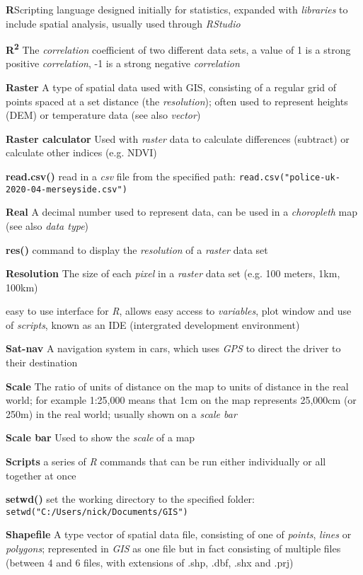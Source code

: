 \documentclass[a4paper,10pt]{article}
\begin{document}
\begin{multicols}{2}
\textbf{R}Scripting language designed initially for statistics, expanded with \textit{libraries} to include spatial analysis, usually used through  \textit{RStudio}

\textbf{R\textsuperscript{2}} The \textit{correlation} coefficient of two different data sets, a value of 1 is a strong positive \textit{correlation}, -1 is a strong negative \textit{correlation}

\textbf{Raster} A type of spatial data used with GIS, consisting of a regular grid of points spaced at a set distance (the \textit{resolution}); often used to represent heights (DEM) or temperature data (see also \textit{vector})

\textbf{Raster calculator} Used with \textit{raster} data to calculate differences (subtract) or calculate other indices (e.g. NDVI)

\textbf{read.csv()} read in a \textit{csv} file from the specified path: \texttt{read.csv("police-uk-2020-04-merseyside.csv")}

\textbf{Real} A decimal number used to represent data, can be used in a \textit{choropleth} map (see also \textit{data type}) 

\textbf{res()} command to display the \textit{resolution} of a \textit{raster} data set

\textbf{Resolution} The size of each \textit{pixel} in a \textit{raster} data set (e.g. 100 meters, 1km, 100km)

 easy to use interface for \textit{R}, allows easy access to \textit{variables}, plot window and use of \textit{scripts}, known as an IDE (intergrated development environment)

\textbf{Sat-nav} A navigation system in cars, which uses \textit{GPS} to direct the driver to their destination

\textbf{Scale} The ratio of units of distance on the map to units of distance in the real world; for example 1:25,000 means that 1cm on the map represents 25,000cm (or 250m) in the real world; usually shown on a \textit{scale bar}

\textbf{Scale bar} Used to show the \textit{scale} of a map

\textbf{Scripts} a series of \textit{R} commands that can be run either individually or all together at once

\textbf{setwd()} set the working directory to the specified folder: \texttt{setwd("C:/Users/nick/Documents/GIS")}

\textbf{Shapefile} A type vector of spatial data file, consisting of one of \textit{points}, \textit{lines} or \textit{polygons}; represented in \textit{GIS} as one file but in fact consisting of multiple files (between 4 and 6 files, with extensions of .shp, .dbf, .shx and  .prj)


\end{multicols}
\end{document}
